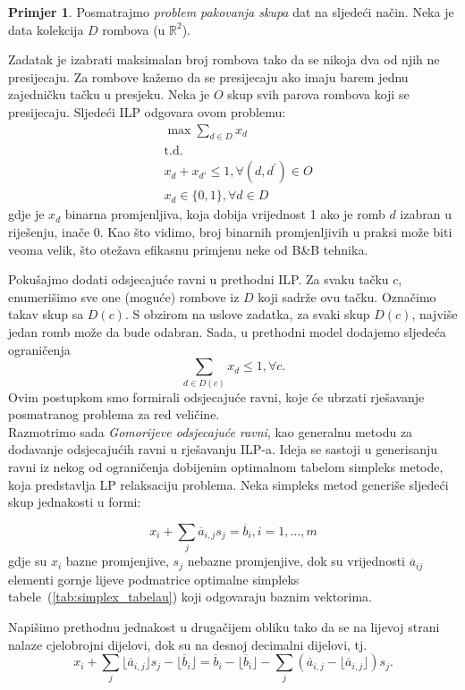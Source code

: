 \documentclass[b5paper, utf8, 11pt, colorlinks]{book}
\theoremstyle{definition}
\newtheorem{primjer}{Primjer}[chapter]
\begin{document}
\begin{primjer}
Posmatrajmo   \emph{problem pakovanja skupa} dat na sljedeći način. Neka je data kolekcija $D$ rombova (u $\mathbb{R}^2$). 
\end{primjer}
Zadatak je izabrati maksimalan broj rombova tako da se nikoja dva od njih ne presijecaju.  Za rombove kažemo da se presijecaju ako imaju barem jednu zajedničku tačku u presjeku. 
Neka je $O$ skup svih parova rombova koji se presijecaju. Sljedeći ILP odgovara ovom problemu:
\begin{align*}
    &\max \sum_{d\in D}x_d\\
    &\mbox{t.d.} \\
    & x_d + x_{d'} \leq 1, \forall (d, d^{'}) \in O \\
    & x_d \in \{0,1\}, \forall d \in D
\end{align*}
gdje je $x_d$ binarna promjenljiva, koja dobija vrijednost 1 ako je romb $d$ izabran u riješenju, inače 0. 
Kao što vidimo, broj binarnih promjenljivih u praksi može biti veoma velik, što otežava efikasnu primjenu neke od B\&B tehnika.

Pokušajmo dodati odsjecajuće ravni u prethodni ILP. Za svaku tačku $c$, enumerišimo sve one (moguće) rombove iz $D$ koji sadrže ovu tačku. Označimo takav skup sa $D(c)$. S obzirom na uslove zadatka, za svaki skup $D(c)$, najviše jedan romb može da bude odabran. Sada,  u prethodni model dodajemo sljedeća ograničenja
\begin{equation}
     \sum_{d \in D(c)} x_d \leq 1, \forall c.
\end{equation}
Ovim postupkom smo formirali odsjecajuće ravni, koje će ubrzati rješavanje posmatranog problema za   red veličine. \\

Razmotrimo sada \emph{Gomorijeve odsjecajuće ravni}, kao generalnu metodu za dodavanje odsjecajućih ravni u rješavanju  ILP-a.  Ideja se sastoji u generisanju ravni iz nekog od ograničenja dobijenim optimalnom tabelom simpleks metode, koja predstavlja LP relaksaciju problema. Neka simpleks metod generiše sljedeći skup jednakosti u formi:
 

$$x_i + \sum_{ j} \overline{a}_{i,j} s_j= \overline{b}_i, i=1, \ldots,m$$
gdje su $x_i$ bazne promjenjive, $s_j$ nebazne promjenjive, dok su vrijednosti $\overline{a}_{ij}$ elementi gornje lijeve podmatrice optimalne simpleks tabele~(\ref{tab:simplex_tabelau}) koji odgovaraju baznim vektorima.  
 
 Napišimo prethodnu jednakost u drugačijem obliku tako da se na lijevoj strani nalaze cjelobrojni dijelovi, dok su na desnoj decimalni dijelovi, tj.
$$x_i + \sum_{j} \lfloor \overline{a}_{i,j} \rfloor s_j - \lfloor \overline{b}_i \rfloor = \overline{b}_i - \lfloor \overline{b}_i  \rfloor    - \sum_{j} (\overline{a}_{i,j} - \lfloor \overline{a}_{i,j} \rfloor) s_j.$$
\end{document}
